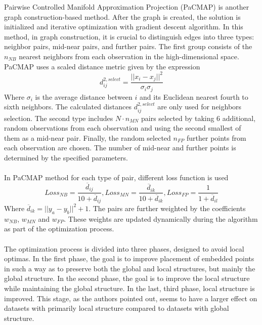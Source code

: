 \documentclass[12pt]{article}
\begin{document}
Pairwise Controlled Manifold Approximation Projection (PaCMAP) is another graph construction-based method. After the graph is created, the solution is initialized and iterative optimization with gradient descent algorithm. In this method, in graph construction, it is crucial to distinguish edges into three types: neighbor pairs, mid-near pairs, and further pairs. 
The first group consists of the $n_{NB}$ nearest neighbors from each observation in the high-dimensional space. PaCMAP uses a scaled distance metric given by the expression
\begin{equation}
\label{eq:pacmap_sd}
    d_{ij}^{2,select}=\frac{||x_i-x_j||^2}{\sigma_i\sigma_j}
\end{equation}
Where $\sigma_i$ is the average distance between $i$ and its Euclidean nearest fourth to sixth neighbors. The calculated distances $d_{ij}^{2,select}$ are only used for neighbors selection.
The second type includes $N\cdot n_{MN}$ pairs selected by taking 6 additional, random observations from each observation and using the second smallest of them as a mid-near pair.
Finally, the random selected $n_{FP}$ further points from each observation are chosen. The number of mid-near and further points is determined by the specified parameters. 
\\
\\
In PaCMAP method for each type of pair, different loss function is used
\begin{equation}
\label{eq:pacmap_loss_functions}
    Loss_{NB}=\frac{\overline{d}_{ij}}{10+\overline{d}_{ij}}, Loss_{MN}=\frac{\overline{d}_{ik}}{10+\overline{d}_{ik}},
    Loss_{FP}=\frac{1}{1+\overline{d}_{il}}
\end{equation}
Where $\overline{d}_{ik}=||y_a-y_b||^2 +1$. The pairs are further weighted by the coefficients $w_{NB}$, $w_{MN}$ and $w_{FP}$. These weights are updated dynamically during the algorithm as part of the optimization process.
\\
\\
The optimization process is divided into three phases, designed to avoid local optimas. In the first phase, the goal is to improve placement of embedded points in such a way as to preserve both the global and local structures, but mainly the global structure. In the second phase, the goal is to improve the local structure while maintaining the global structure. In the last, third phase, local structure is improved. This stage, as the authors pointed out, seems to have a larger effect on datasets with primarily local structure compared to datasets with global structure\cite{JMLR:v22:20-1061}.
\end{document}
